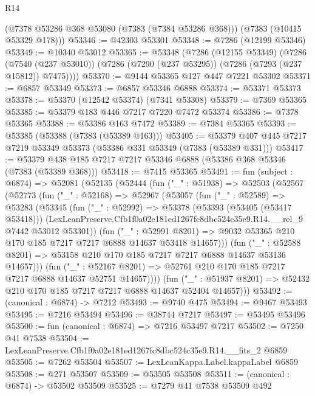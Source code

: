 \begin{lexlean}{R14}
\begin{coremodule}
      (@7378 @53286 @368 @53080 (@7383 (@7384 @53286 @368)))
      (@7383 (@10415 @53329 @178)))
@53346 := @42303 @53301
@53348 := @7286 (@12199 @53346)
@53349 := @10340 @53012
@53365 := @53348
    (@7286
      (@12155 @53349)
      (@7286
        (@7540 (@237 @53010))
        (@7286 (@7290 (@237 @53295)) (@7286 (@7293 (@237 @15812)) @7475))))
@53370 := @9144 @53365 @127 @447 @7221 @53302
@53371 := @6857 @53349
@53373 := @6857 @53346 @6888
@53374 := @53371 @53373
@53378 := @53370 (@12542 @53374) (@7341 @53308)
@53379 := @7369 @53365
@53385 := @53379 @183 @446 @7217 @7220 @7472 @53374
@53386 := @7378 @53365
@53388 := @53386 @163 @7472
@53389 := @7384 @53365
@53393 := @53385 (@53388 (@7383 (@53389 @163)))
@53405 := @53379 @407 @445 @7217 @7219 @53349 @53373 (@53386 @331 @53349 (@7383 (@53389 @331)))
@53417 := @53379 @438 @185 @7217 @7217 @53346 @6888 (@53386 @368 @53346 (@7383 (@53389 @368)))
@53418 := @7415 @53365
@53491 := fun (subject : @6874) =>
  @52081
    (@52135
      (@52444
        (fun ("_" : @51938) =>
        @52503
          (@52567
            (@52773
              (fun ("_" : @52168) =>
              @52967
                (@53057
                  (fun ("_" : @52589) =>
                  @53283
                    (@53345
                      (fun ("_" : @52992) =>
                      @53378
                        (@53393 (@53405 (@53417 @53418)))
                        (LexLeanPreserve.Cfb1f0a02e181ed1267fc8dbc524c35e9.R14.__rel_9
                          @7442
                          @53012
                          @53301))
                      (fun ("_" : @52991 @8201) =>
                      @9032 @53365 @210 @170 @185 @7217 @7217 @6888 @14637 @53418 @14657)))
                  (fun ("_" : @52588 @8201) =>
                  @53158 @210 @170 @185 @7217 @7217 @6888 @14637 @53136 @14657)))
              (fun ("_" : @52167 @8201) =>
              @52761 @210 @170 @185 @7217 @7217 @6888 @14637 @52751 @14657))))
        (fun ("_" : @51937 @8201) => @52432 @210 @170 @185 @7217 @7217 @6888 @14637 @52404 @14657)))
@53492 := (canonical : @6874) -> @7212
@53493 := @9740 @475
@53494 := @9467 @53493
@53495 := @7216 @53494
@53496 := @38744 @7217
@53497 := @53495 @53496
@53500 := fun (canonical : @6874) => @7216 @53497 @7217
@53502 := @7250 @41 @7538
@53504 := LexLeanPreserve.Cfb1f0a02e181ed1267fc8dbc524c35e9.R14.__fits_2 @6859
@53505 := @7262 @53504
@53507 := LexLeanKappa.Label.kappaLabel @6859
@53508 := @271 @53507
@53509 := @53505 @53508
@53511 := (canonical : @6874) -> @53502 @53509
@53525 := @7279
    @41
    @7538
    @53509
    @492

\end{coremodule}
\end{lexlean}
